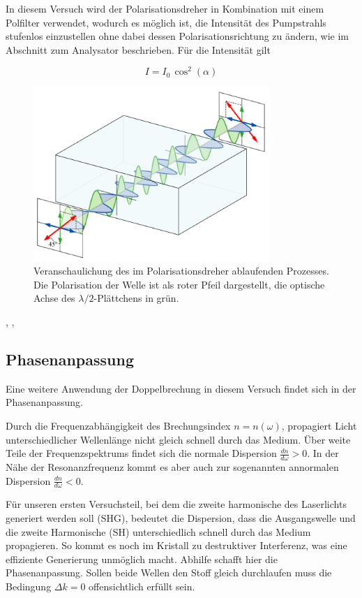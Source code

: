 In diesem Versuch wird der Polarisationsdreher in Kombination mit einem Polfilter verwendet, wodurch es möglich ist, die Intensität des Pumpstrahls stufenlos einzustellen ohne dabei dessen Polarisationsrichtung zu ändern, wie im Abschnitt zum Analysator beschrieben. Für die Intensität gilt

\[I=I_{0}\, \cos^2(\alpha)\]

\begin{figure}[H]
	\centering
        \includegraphics[width=0.8\textwidth]{Abb/lambda_halbe.png}
        \caption{Veranschaulichung des im Polarisationsdreher ablaufenden Prozesses. Die Polarisation der Welle ist als roter Pfeil dargestellt, die optische Achse des $\lambda/2$-Plättchens in grün.\autocite{wiki:lambdahalbe}}
	\label{lambda_halbe}
\end{figure}

\autocite{zinth}, \autocite{hecht}, \autocite{demtroeder}

    \subsection{Phasenanpassung}

Eine weitere Anwendung der Doppelbrechung in diesem Versuch findet sich in der
Phasenanpassung.

Durch die Frequenzabhängigkeit des Brechungsindex $n=n(\omega)$, propagiert Licht
unterschiedlicher Wellenlänge nicht gleich schnell durch das Medium.
Über weite Teile der Frequenzspektrums findet sich die normale Dispersion
$\frac{dn}{d\omega} > 0$. In der Nähe der Resonanzfrequenz kommt es aber auch 
zur sogenannten annormalen Dispersion $\frac{dn}{d\omega} < 0$. 

Für unseren ersten Versuchsteil, bei dem die zweite harmonische des Laserlichts
generiert werden soll (SHG), bedeutet die Dispersion, dass die Ausgangswelle und die 
zweite Harmonische (SH) unterschiedlich schnell durch das Medium propagieren. 
So kommt es noch im Kristall zu destruktiver Interferenz, was eine effiziente 
Generierung unmöglich macht.
Abhilfe schafft hier die Phasenanpassung. Sollen beide Wellen den Stoff gleich
durchlaufen muss die Bedingung $\Delta k = 0$ offensichtlich erfüllt sein. 

